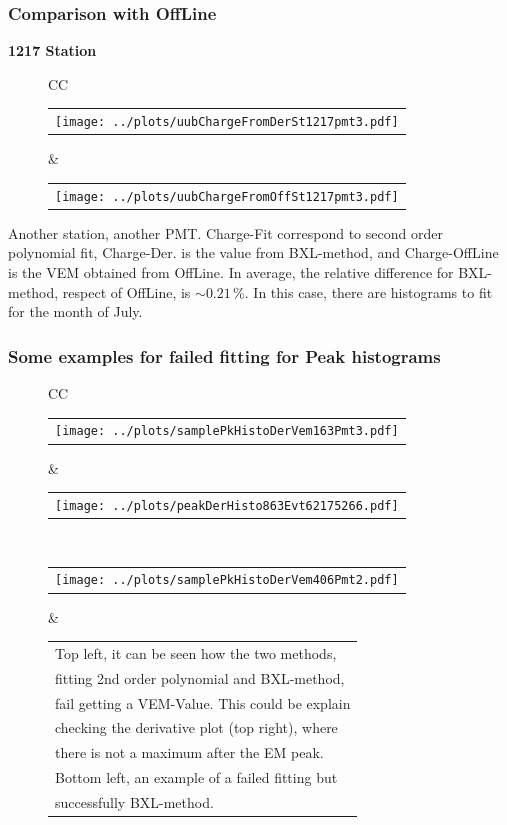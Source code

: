 \documentclass[aspectratio=169]{beamer}
\begin{document}
\begin{frame} 
  \frametitle{Comparison with OffLine}
  {\bf 1217 Station}
  \begin{figure}
    \centering
    \begin{tabularx}{\textwidth}{CC}
      \begin{tabular}{l}
        \texttt{[image: ../plots/uubChargeFromDerSt1217pmt3.pdf]}
      \end{tabular}
      &
      \begin{tabular}{l}
        \texttt{[image: ../plots/uubChargeFromOffSt1217pmt3.pdf]}
      \end{tabular}
    \end{tabularx}
  \end{figure}
  Another station, another PMT. Charge-Fit correspond to second
  order polynomial fit, Charge-Der. is the value from BXL-method,
  and Charge-OffLine is the VEM obtained from OffLine. In
  average, the relative difference for BXL-method, respect of
  OffLine, is $\sim 0.21$\,\%. In this case, there are histograms
  to fit for the month of July.
\end{frame}


\begin{frame} 
  \frametitle{Some examples for failed fitting for Peak
  histograms}
  \begin{figure}
    \centering
    \begin{tabularx}{\textwidth}{CC}
      \begin{tabular}{l}
        \texttt{[image: ../plots/samplePkHistoDerVem163Pmt3.pdf]}
      \end{tabular}
      &
      \begin{tabular}{l}
        \texttt{[image: ../plots/peakDerHisto863Evt62175266.pdf]}
      \end{tabular}
      \\
      \begin{tabular}{l}
        \texttt{[image: ../plots/samplePkHistoDerVem406Pmt2.pdf]}
      \end{tabular}
      &
      \footnotesize
      \begin{tabular}{l}
        Top left, it can be seen how the two methods, \\
        fitting 2nd order polynomial and BXL-method, \\
        fail getting a VEM-Value. This could be explain \\
        checking the derivative plot (top right), where \\
        there is not a maximum after the EM peak. \\
        Bottom left, an example of a failed fitting but \\
        successfully BXL-method.
      \end{tabular}
    \end{tabularx}
  \end{figure}
\end{frame}
\end{document}
